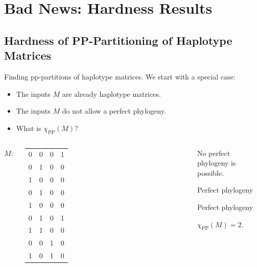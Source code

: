 \documentclass[aspectratio=1610]{beamer}
\begin{document}
\section{Bad News: Hardness Results}

\subsection{Hardness of PP-Partitioning of Haplotype Matrices}

\begin{frame}{Finding pp-partitions of haplotype matrices.}
  We start with a special case:
  \begin{itemize}
  \item The inputs $M$ are \alert{already haplotype matrices}.
  \item The inputs $M$ \alert{do not allow a perfect phylogeny}.
  \item What is $\chi_{\operatorname{PP}}(M)$?
  \end{itemize}
  \begin{example}
    \begin{columns}
      $M\colon$
      \footnotesize
      \begin{tabular}{cccc}
        0 & 0 & 0 & 1 \\
        0 & 1 & 0 & 0 \\
        1 & 0 & 0 & 0 \\
        0 & 1 & 0 & 0 \\
        1 & 0 & 0 & 0 \\
        0 & 1 & 0 & 1 \\
        1 & 1 & 0 & 0 \\
        0 & 0 & 1 & 0 \\
        1 & 0 & 1 & 0
      \end{tabular}%
      {%
      }
      \begin{overprint}
        No perfect phylogeny is possible.
        
        \textcolor{blue!70!bg}{Perfect phylogeny}
        
        \textcolor{red!70!bg}{Perfect phylogeny}
        
        $\chi_{\operatorname{PP}}(M) = 2$.
        
      \end{overprint}
    \end{columns}
  \end{example}
\end{frame}
\end{document}
